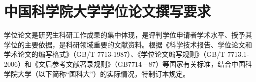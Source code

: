 \chapter{中国科学院大学学位论文撰写要求}

学位论文是研究生科研工作成果的集中体现，是评判学位申请者学术水平、授予其学位的主要依据，是科研领域重要的文献资料。根据《科学技术报告、学位论文和学术论文的编写格式》（GB/T 7713-1987）、《学位论文编写规则》（GB/T 7713.1-2006）和《文后参考文献著录规则》（GB7714—87）等国家有关标准，结合中国科学院大学（以下简称“国科大”）的实际情况，特制订本规定。
